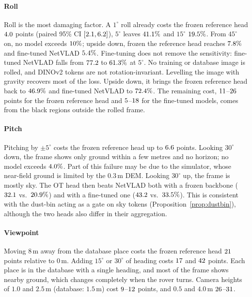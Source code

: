 \documentclass[letterpaper,journal]{IEEEtran}
\newcommand{\cref}[1]{Proposition~\ref{#1}}
\begin{document}
\paragraph*{Roll} Roll is the most damaging factor. A $1^\circ$ roll already costs the frozen reference head
$4.0$ points (paired 95\% CI $[2.1,6.2]$), $5^\circ$ leaves $41.1\%$ and
$15^\circ$ $19.5\%$. From $45^\circ$ on, no model exceeds $10\%$; upside down, frozen
the reference head reaches $7.8\%$ and fine-tuned NetVLAD $5.4\%$. Fine-tuning does not remove the sensitivity:
fine-tuned NetVLAD falls from $77.2$ to $61.3\%$ at $5^\circ$. No training or database image
is rolled, and DINOv2 tokens are not rotation-invariant. Levelling the image with gravity recovers most of
the loss. Upside down, it brings the frozen reference head back to $46.9\%$ and fine-tuned NetVLAD to
$72.4\%$. The remaining cost, $11$--$26$ points for the frozen reference head and
$5$--$18$ for the fine-tuned models, comes from the black regions outside the
rolled frame.

\paragraph*{Pitch} Pitching by $\pm5^\circ$ costs the frozen reference head up to $6.6$ points. Looking
$30^\circ$ down, the frame shows only ground within a few metres and no horizon; no model exceeds
$4.0\%$. Part of this failure may be due to the simulator, whose near-field ground is limited by
the $0.3$\,m DEM. Looking $30^\circ$ up, the frame is mostly sky. The OT head then beats NetVLAD both with a
frozen backbone ($32.1$ vs.\ $20.9\%$) and with a fine-tuned one ($43.2$ vs.\
$33.5\%$). This is consistent with the dust-bin acting as a gate on sky tokens
(\cref{prop:dustbin}), although the two heads also differ in their aggregation.

\paragraph*{Viewpoint} Moving $8$\,m away from the database place costs the frozen reference head $21$
points relative to $0$\,m. Adding $15^\circ$ or $30^\circ$ of heading costs $17$ and
$42$ points. Each place is in the database with a single heading, and most of the frame shows
nearby ground, which changes completely when the rover turns. Camera heights of $1.0$ and $2.5$\,m
(database: $1.5$\,m) cost $9$--$12$ points, and $0.5$ and $4.0$\,m
$26$--$31$.
\end{document}

